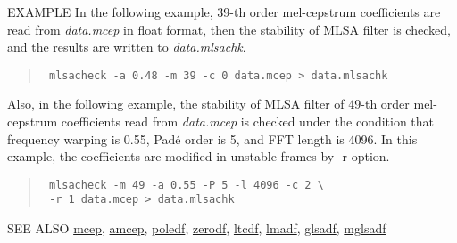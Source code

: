 \begin{qsection}{EXAMPLE}
In the following example,
39-th order mel-cepstrum coefficients are
read from {\em data.mcep} in float format,
then the stability of MLSA filter is checked,
 and the results are written to {\em data.mlsachk}.
\begin{quote}
 \verb! mlsacheck -a 0.48 -m 39 -c 0 data.mcep > data.mlsachk !
\end{quote}
 Also, in the following example, the stability of MLSA filter of 49-th order
 mel-cepstrum coefficients read from {\em data.mcep} is checked
 under the condition that
 frequency warping is 0.55, Pad\'e order is 5, and FFT length is 4096.
 In this example, the coefficients are modified in unstable frames by -r option.
\begin{quote}
 \verb! mlsacheck -m 49 -a 0.55 -P 5 -l 4096 -c 2 \ !\\
 \verb! -r 1 data.mcep > data.mlsachk!
\end{quote}
\end{qsection}

\begin{qsection}{SEE ALSO}
\hyperlink{mcep}{mcep},
\hyperlink{amcep}{amcep},
\hyperlink{poledf}{poledf},
\hyperlink{zerodf}{zerodf},
\hyperlink{ltcdf}{ltcdf},
\hyperlink{lmadf}{lmadf},
\hyperlink{glsadf}{glsadf},
\hyperlink{mglsadf}{mglsadf}
\end{qsection}
